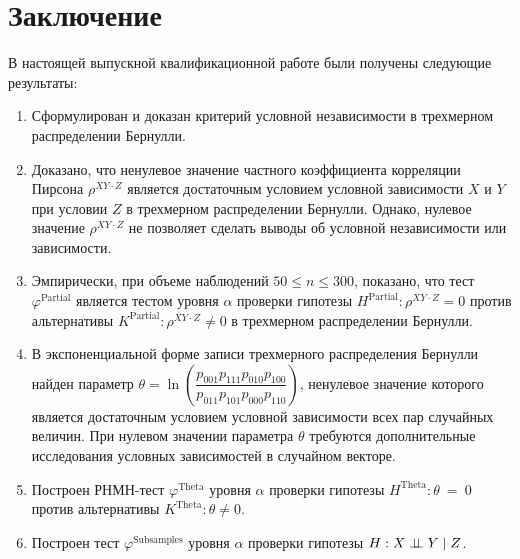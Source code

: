 \section*{Заключение}
В настоящей выпускной квалификационной работе 
были получены следующие результаты:
\begin{enumerate}
    \item Сформулирован и доказан критерий условной независимости
    в трехмерном распределении Бернулли.
    \item Доказано, что ненулевое значение
    частного коэффициента корреляции Пирсона 
    $\rho^{XY \cdot Z}$ является достаточным
    условием условной зависимости $X$ и $Y$ при 
    условии $Z$ в трехмерном распределении Бернулли.
    Однако, нулевое значение $\rho^{XY \cdot Z}$ не позволяет сделать выводы
    об условной независимости или зависимости.
    \item Эмпирически, при объеме наблюдений $50 \leq n \leq 300$,
    показано, что тест
    $\varphi^{\text{Partial}}$ является тестом уровня
    $\alpha$ проверки гипотезы $H^{\text{Partial}}: \rho^{XY\cdot Z}=0$ 
    против альтернативы $K^{\text{Partial}}: \rho^{XY\cdot Z}\neq 0$
    в трехмерном распределении
    Бернулли.
    \item В экспоненциальной форме записи трехмерного 
    распределения Бернулли найден параметр 
    $\theta = \ln  \left(\dfrac{p_{001}p_{111}p_{010}p_{100}}{p_{011}p_{101}p_{000}p_{110}}\right)$,
    ненулевое значение которого является достаточным 
    условием условной зависимости всех пар
    случайных величин.
    При нулевом значении параметра $\theta$ требуются дополнительные
    исследования условных зависимостей в случайном векторе.
    \item Построен РНМН-тест $\varphi^{\text{Theta}}$
    уровня $\alpha$ проверки гипотезы $H^{\text{Theta}}: \theta~=~0$
    против альтернативы $K^{\text{Theta}}: \theta\neq 0$.
    \item Построен тест $\varphi^{\text{Subsamples}}$ 
    уровня $\alpha$
    проверки гипотезы $H: X \perp\!\!\!\perp Y \mid Z$.
\end{enumerate}
